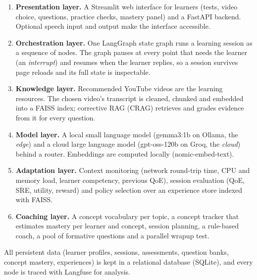 \begin{enumerate}
  \item \textbf{Presentation layer.} A Streamlit web interface for learners (tests, video choice, questions, practice
        checks, mastery panel) and a FastAPI backend. Optional speech input and output make the interface accessible.
  \item \textbf{Orchestration layer.} One LangGraph state graph runs a learning session as a sequence of nodes. The
        graph pauses at every point that needs the learner (an \emph{interrupt}) and resumes when the learner replies,
        so a session survives page reloads and its full state is inspectable.
  \item \textbf{Knowledge layer.} Recommended YouTube videos are the learning resources. The chosen video's transcript
        is cleaned, chunked and embedded into a FAISS index; corrective RAG (CRAG) retrieves and grades evidence from
        it for every question.
  \item \textbf{Model layer.} A local small language model (gemma3:1b on Ollama, the \emph{edge}) and a cloud large
        language model (gpt-oss-120b on Groq, the \emph{cloud}) behind a router. Embeddings are computed locally
        (nomic-embed-text).
  \item \textbf{Adaptation layer.} Context monitoring (network round-trip time, CPU and memory load, learner
        competency, previous QoE), session evaluation (QoE, SRE, utility, reward) and policy selection over an
        experience store indexed with FAISS.
  \item \textbf{Coaching layer.} A concept vocabulary per topic, a concept tracker that estimates mastery per learner
        and concept, session planning, a rule-based coach, a pool of formative questions and a parallel wrapup test.
\end{enumerate}

All persistent data (learner profiles, sessions, assessments, question banks, concept mastery, experiences) is kept in
a relational database (SQLite), and every node is traced with Langfuse for analysis.

